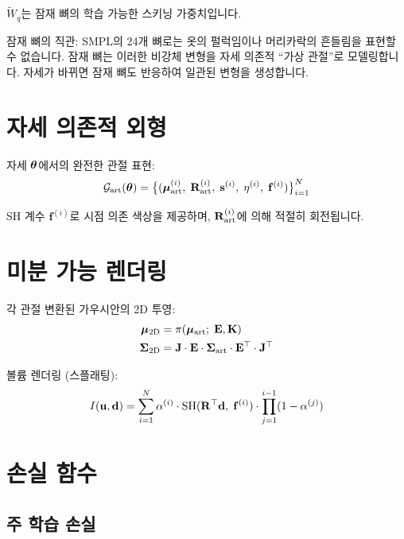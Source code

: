 \documentclass[11pt, a4paper]{report}
\begin{document}
$\tilde{W}_q$는 잠재 뼈의 학습 가능한 스키닝 가중치입니다.

\begin{keyidea}
잠재 뼈의 직관: SMPL의 24개 뼈로는 옷의 펄럭임이나 머리카락의 흔들림을 표현할 수 없습니다. 잠재 뼈는 이러한 비강체 변형을 자세 의존적 ``가상 관절''로 모델링합니다. 자세가 바뀌면 잠재 뼈도 반응하여 일관된 변형을 생성합니다.
\end{keyidea}


\section{자세 의존적 외형}

자세 $\bm{\theta}$에서의 완전한 관절 표현:
\begin{equation}
\mathcal{G}_{\text{art}}(\bm{\theta}) = \big\{ (\bm{\mu}_{\text{art}}^{(i)},\; \mathbf{R}_{\text{art}}^{(i)},\; \mathbf{s}^{(i)},\; \eta^{(i)},\; \mathbf{f}^{(i)}) \big\}_{i=1}^{N}
\end{equation}

SH 계수 $\mathbf{f}^{(i)}$로 시점 의존 색상을 제공하며, $\mathbf{R}_{\text{art}}^{(i)}$에 의해 적절히 회전됩니다.


\section{미분 가능 렌더링}

각 관절 변환된 가우시안의 2D 투영:
\begin{align}
\bm{\mu}_{\text{2D}} &= \pi(\bm{\mu}_{\text{art}};\; \mathbf{E}, \mathbf{K}) \\
\bm{\Sigma}_{\text{2D}} &= \mathbf{J} \cdot \mathbf{E} \cdot \bm{\Sigma}_{\text{art}} \cdot \mathbf{E}^\top \cdot \mathbf{J}^\top
\end{align}

볼륨 렌더링 (스플래팅):
\begin{equation}
I(\mathbf{u}, \mathbf{d}) = \sum_{i=1}^{N} \alpha^{(i)} \cdot \mathrm{SH}(\mathbf{R}^{\top} \mathbf{d},\; \mathbf{f}^{(i)}) \cdot \prod_{j=1}^{i-1}(1 - \alpha^{(j)})
\end{equation}


\section{손실 함수}
\label{sec:gart_loss}

\subsection{주 학습 손실}
\end{document}
